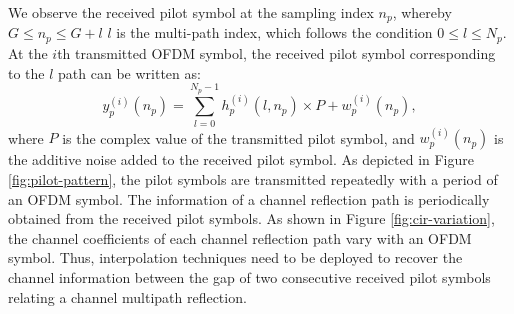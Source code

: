 \documentclass[12pt,journal,draftclsnofoot,onecolumn]{IEEEtran}
\begin{document}
We observe the received pilot symbol at the sampling index $n_p$, whereby $G\leq n_p \leq G + l$ $l$ is the multi-path index, which follows the condition $0\leq l \leq N_p $.  At the $i$th transmitted OFDM symbol, the received pilot symbol corresponding to the $l$ path can be written as:
	\begin{equation}\label{eq:received-pilot-symbol}
	y^{(i)}_{p}(n_p) = \sum_{l = 0}^{N_p - 1} h^{(i)}_{p}(l,n_p) \times P  + w^{(i)}_{p}(n_p),                 
	\end{equation}
where $P$ is the complex value of the transmitted pilot symbol, and $w^{(i)}_{p}(n_p)$ is the additive noise added to the received pilot symbol. As depicted in Figure \ref{fig:pilot-pattern}, the pilot symbols are transmitted repeatedly with a period of an OFDM symbol. The information of a channel reflection path is periodically obtained from the received pilot symbols. As shown in Figure  \ref{fig:cir-variation}, the channel coefficients  of each channel reflection path vary with an OFDM symbol. Thus, interpolation techniques need to be deployed to recover the channel information between the gap of two consecutive received pilot symbols relating a channel multipath reflection. 
\end{document}
